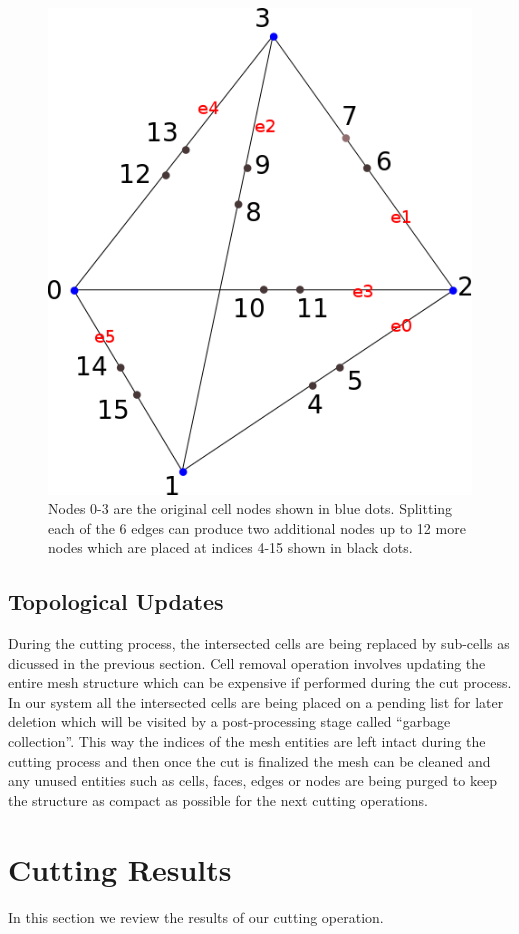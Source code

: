 \begin{figure}[H]
  \centering
  \includegraphics[width=0.6\linewidth]{figures/cutting/midpoints.png}
  \caption{\label{fig:midpoints}
  {Nodes 0-3 are the original cell nodes shown in blue dots. Splitting each of the 6 edges can produce two additional nodes up to 12 more nodes which 
  are placed at indices 4-15 shown in black dots.}
}
\end{figure}

\subsection{Topological Updates}
During the cutting process, the intersected cells are being replaced by sub-cells as dicussed in the previous section. Cell removal operation involves updating the entire 
mesh structure which can be expensive if performed during the cut process. In our system all the intersected cells are being placed on a pending list for later deletion 
which will be visited by a post-processing stage called ``garbage collection''. This way the indices of the mesh entities are left intact during the cutting process and 
then once the cut is finalized the mesh can be cleaned and any unused entities such as cells, faces, edges or nodes are being purged to keep the structure as compact as 
possible for the next cutting operations.

\section{Cutting Results}
In this section we review the results of our cutting operation. 